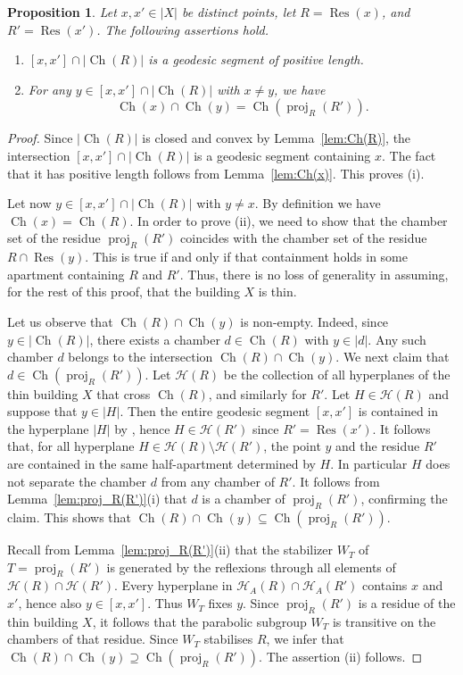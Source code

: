 \documentclass[12pt,a4paper]{amsproc}
\newtheorem{proposition}[theorem]{Proposition}
\theoremstyle{definition}
\DeclareMathOperator{\Ch}{Ch}
\DeclareMathOperator{\proj}{proj}
\DeclareMathOperator{\Res}{Res}
\begin{document}
\begin{proposition}\label{prop:proj}
Let $x, x' \in |X|$ be distinct points, let  $R = \Res(x)$, and $ R'=\Res(x')$. The following assertions hold. 
\begin{enumerate}[label=(\roman*)]
\item $[x, x'] \cap |\Ch(R)|$ is a geodesic segment of positive length. 
\item For any $y \in [x, x'] \cap |\Ch(R)|$ with   $x \neq y$, we have 
$$\Ch(x) \cap \Ch(y) = \Ch(\proj_R(R')).$$
\end{enumerate}	
\end{proposition}
\begin{proof}
Since $|\Ch(R)| $ is closed and convex by Lemma~\ref{lem:Ch(R)}, the intersection $[x, x'] \cap |\Ch(R)|$ is a geodesic segment containing $x$. The fact that it has positive length follows from Lemma~\ref{lem:Ch(x)}. This proves (i). 

Let now $y \in [x, x'] \cap |\Ch(R)|$ with $y \neq x$. By definition we have $\Ch(x) = \Ch(R)$.  In order to prove (ii), we need to show that the chamber set of the residue $\proj_R(R')$ coincides with the chamber set of the residue $R \cap \Res(y)$. This is true if and only if that containment holds in some apartment containing $R$ and $R'$. Thus, there is no loss of generality in assuming, for the rest of this proof, that the building $X$ is thin. 

Let us   observe that $\Ch(R) \cap \Ch(y)$ is non-empty. Indeed, since $y \in |\Ch(R)|$, there exists a chamber $d \in \Ch(R)$ with $y \in |d|$. Any such chamber $d$ belongs to the intersection $\Ch(R) \cap \Ch(y)$. We next claim that $d \in \Ch(\proj_R(R'))$.   Let $\mathcal H(R) $ be the collection of all hyperplanes of the thin building $X$ that cross   $\Ch(R)$, and similarly for $R'$. Let $H  \in \mathcal H(R)$ and suppose that $y \in |H|$. Then the entire geodesic segment $[x, x'] $ is contained in the hyperplane  $|H|$ by \cite[Lemma~3.4]{NoskovVinberg}, hence $H \in \mathcal H(R')$ since $R'=\Res(x')$. It follows that, for all hyperplane $H  \in \mathcal H(R) \setminus \mathcal H(R')$, the point $y$ and the residue $R'$ are contained  in the same half-apartment determined by $H$. In particular $H$ does not separate the chamber $d$ from any chamber of $R'$. It follows from Lemma~\ref{lem:proj_R(R')}(i) that $d$ is a chamber of $ \proj_R(R')$, confirming the claim. This shows that $\Ch(R) \cap \Ch(y) \subseteq \Ch(\proj_R(R')).$

Recall from Lemma~\ref{lem:proj_R(R')}(ii) that the stabilizer $W_{T}$ of $T = \proj_R(R')$ is generated by the reflexions through all elements of $ \mathcal H(R) \cap \mathcal H(R')$. Every hyperplane in $ \mathcal H_A(R) \cap \mathcal H_A(R')$ contains $x$ and $x'$, hence also $y \in [x, x']$. Thus $W_T$ fixes $y$. Since $\proj_R(R')$ is a residue of the thin building $X$, it follows that the parabolic subgroup $W_T$ is transitive on the chambers of that residue. Since $W_T$ stabilises $R$, we infer that $ \Ch(R) \cap \Ch(y) \supseteq \Ch(\proj_R(R'))$. The assertion (ii) follows. 
\end{proof}
		
\end{document}
